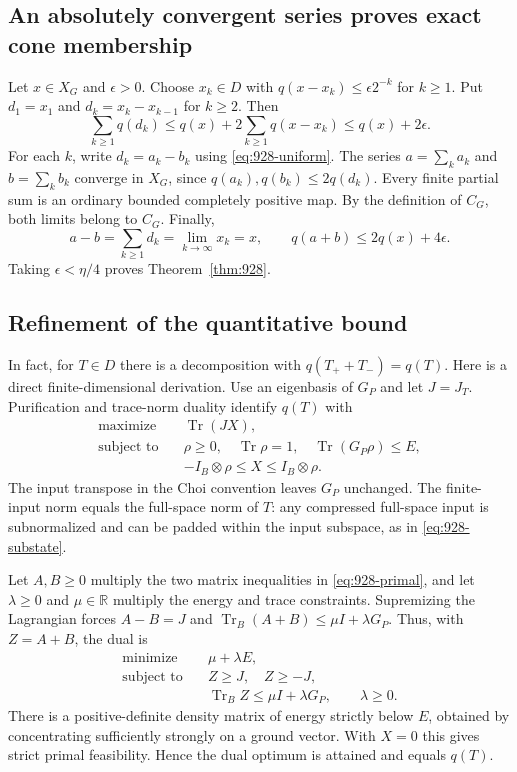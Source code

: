 \documentclass[11pt,a4paper]{article}
\theoremstyle{remark}
\begin{document}
\subsection{An absolutely convergent series proves exact cone membership}

Let $x\in X_G$ and $\epsilon>0$. Choose $x_k\in D$ with
$q(x-x_k)\le\epsilon2^{-k}$ for $k\ge1$. Put $d_1=x_1$ and
$d_k=x_k-x_{k-1}$ for $k\ge2$. Then
\[
 \sum_{k\ge1}q(d_k)
 \le q(x)+2\sum_{k\ge1}q(x-x_k)
 \le q(x)+2\epsilon.
 \tag{928.7}\label{eq:928-series}
\]
For each $k$, write $d_k=a_k-b_k$ using
\eqref{eq:928-uniform}. The series $a=\sum_ka_k$ and $b=\sum_kb_k$
converge in $X_G$, since $q(a_k),q(b_k)\le2q(d_k)$.
Every finite partial sum is an ordinary bounded completely positive map.
By the definition of $C_G$, both limits belong to $C_G$. Finally,
\[
 a-b=\sum_{k\ge1}d_k=\lim_{k\to\infty}x_k=x,
 \qquad q(a+b)\le2q(x)+4\epsilon.
\]
Taking $\epsilon<\eta/4$ proves Theorem~\ref{thm:928}.

\subsection{Refinement of the quantitative bound}

In fact, for $T\in D$ there is a decomposition with
$q(T_++T_-)=q(T)$. Here is a direct finite-dimensional derivation.
Use an eigenbasis of $G_P$ and let $J=J_T$. Purification and trace-norm
duality identify $q(T)$ with
\[
 \begin{aligned}
 \text{maximize}\quad&\operatorname{Tr}(JX),\\
 \text{subject to}\quad&\rho\ge0,\quad\operatorname{Tr}\rho=1,
   \quad\operatorname{Tr}(G_P\rho)\le E,\\
 &-I_B\otimes\rho\le X\le I_B\otimes\rho.
 \end{aligned}
 \tag{928.8}\label{eq:928-primal}
\]
The input transpose in the Choi convention leaves $G_P$ unchanged.
The finite-input norm equals the full-space norm of $T$: any compressed
full-space input is subnormalized and can be padded within the input
subspace, as in \eqref{eq:928-substate}.

Let $A,B\ge0$ multiply the two matrix inequalities in
\eqref{eq:928-primal}, and let $\lambda\ge0$ and $\mu\in\mathbb R$
multiply the energy and trace constraints. Supremizing the Lagrangian
forces $A-B=J$ and
$\operatorname{Tr}_B(A+B)\le\mu I+\lambda G_P$. Thus, with $Z=A+B$, the dual is
\[
 \begin{aligned}
 \text{minimize}\quad&\mu+\lambda E,\\
 \text{subject to}\quad&Z\ge J,\quad Z\ge-J,\\
 &\operatorname{Tr}_B Z\le\mu I+\lambda G_P,\qquad\lambda\ge0.
 \end{aligned}
 \tag{928.9}\label{eq:928-dual}
\]
There is a positive-definite density matrix of energy strictly below $E$,
obtained by concentrating sufficiently strongly on a ground vector. With
$X=0$ this gives strict primal feasibility. Hence the dual optimum is
attained and equals $q(T)$.
\end{document}
